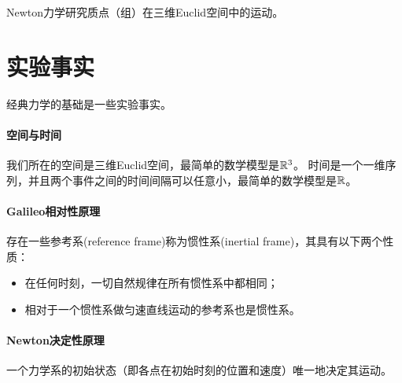 Newton力学研究质点（组）在三维Euclid空间中的运动。

\section*{实验事实}

经典力学的基础是一些实验事实。

\paragraph{空间与时间}
我们所在的空间是三维Euclid空间，最简单的数学模型是$\mathbb R^3$。
时间是一个一维序列，并且两个事件之间的时间间隔可以任意小，最简单的数学模型是$\mathbb R$。

\paragraph{Galileo相对性原理}
存在一些参考系(reference frame)称为惯性系(inertial frame)，其具有以下两个性质：
\begin{itemize}
    \item 在任何时刻，一切自然规律在所有惯性系中都相同；
    \item 相对于一个惯性系做匀速直线运动的参考系也是惯性系。
\end{itemize}

\paragraph{Newton决定性原理}
一个力学系的初始状态（即各点在初始时刻的位置和速度）唯一地决定其运动。